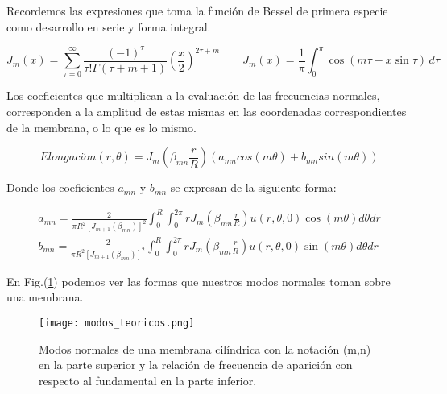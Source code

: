 \documentclass[journal, a4paper,onecolumn]{IEEEtran}
\newcommand{\figref}[1]{Fig.(\ref{#1})}
\begin{document}
Recordemos las expresiones que toma la función de Bessel de primera especie como desarrollo en serie y forma integral.\newline

\begin{equation}
    {\displaystyle J_{m}(x)=\sum _{\tau=0}^{\infty }{\frac {(-1)^{\tau}}{\tau!\Gamma (\tau+m +1)}}{\left({\frac {x}{2}}\right)}^{2\tau+m }}\qquad {\displaystyle J_{m}(x)={\frac {1}{\pi }}\int _{0}^{\pi }\cos(m\tau -x\sin \tau )\,d\tau }
\end{equation}\newline 

Los coeficientes que multiplican a la evaluación de las frecuencias normales, corresponden a la amplitud de estas mismas en las coordenadas correspondientes de la membrana, o lo que es lo mismo.\newline

\begin{equation}
    Elongaci\acute{o}n(r, \theta)= J_{m}(\beta_{mn}\frac{r}{R})(a_{mn}cos(m\theta)+b_{mn}sin(m\theta))
    \label{Amplitudomega}
\end{equation}\newline

Donde los coeficientes $a_{mn}$ y $b_{mn}$ se expresan de la siguiente forma:\newline

\begin{equation}
\begin{array}{l}
a_{m n}=\frac{2}{\pi R^{2}\left[J_{m+1}\left(\beta_{m n}\right)\right]^{2}} \int_{0}^{R} \int_{0}^{2 \pi} r J_{m}\left(\beta_{m n} \frac{r}{R}\right) u(r, \theta, 0) \cos (m \theta) d \theta d r \\
b_{m n}=\frac{2}{\pi R^2\left[J_{m+1}\left(\beta_{m n}\right)\right]^{2}} \int_{0}^{R} \int_{0}^{2 \pi} r J_{m}\left(\beta_{m n} \frac{r}{R}\right) u(r, \theta, 0) \sin (m \theta) d \theta d r
\end{array}
\label{coeficientes}
\end{equation}\newline 

En \figref{modos normales} podemos ver las formas que nuestros modos normales toman sobre una membrana\cite{fisicamusical}.\newline

\begin{figure}[h]
    \centering
    \texttt{[image: modos\_teoricos.png]}
    \caption{Modos normales de una membrana cilíndrica con la notación (m,n) en la parte superior y la relación de frecuencia de aparición con respecto al fundamental en la parte inferior. \cite{fisicamusical}}
    \label{modos normales}
\end{figure}
\end{document}
